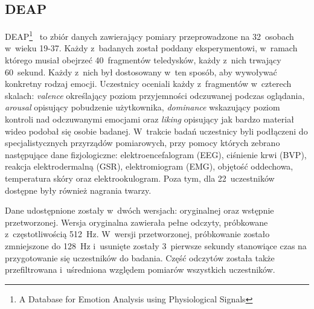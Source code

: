 \subsection{DEAP}
DEAP\footnote{A Database for Emotion Analysis using Physiological Signals}~\cite{deap_dataset_2011} to zbiór danych zawierający pomiary przeprowadzone na 32~osobach w~wieku 19-37. Każdy z~badanych został poddany eksperymentowi, w~ramach którego musiał obejrzeć 40~fragmentów teledysków, każdy z~nich trwający 60~sekund. Każdy z~nich był dostosowany w~ten sposób, aby wywoływać konkretny rodzaj emocji. Uczestnicy oceniali każdy z~fragmentów w~czterech skalach: \textit{valence} określający poziom przyjemności odczuwanej podczas oglądania, \textit{arousal} opisujący pobudzenie użytkownika, \textit{dominance} wskazujący poziom kontroli nad odczuwanymi emocjami oraz \textit{liking} opisujący jak bardzo materiał wideo podobał się osobie badanej. W~trakcie badań uczestnicy byli podłączeni do specjalistycznych przyrządów pomiarowych, przy pomocy których zebrano następujące dane fizjologiczne: elektroencefalogram (EEG), ciśnienie krwi (BVP), reakcja elektrodermalną (GSR), elektromiogram (EMG), objętość oddechowa, temperatura skóry oraz elektrookulogram. Poza tym, dla 22~uczestników dostępne były również nagrania twarzy. 

Dane udostępnione zostały w~dwóch wersjach: oryginalnej oraz wstępnie przetworzonej. Wersja oryginalna zawierała pełne odczyty, próbkowane z~częstotliwością 512~Hz. W~wersji przetworzonej, próbkowanie zostało zmniejszone do 128~Hz i~usunięte zostały 3~pierwsze sekundy stanowiące czas na przygotowanie się uczestników do badania. Część odczytów została także przefiltrowana i~uśredniona względem pomiarów wszystkich uczestników.

